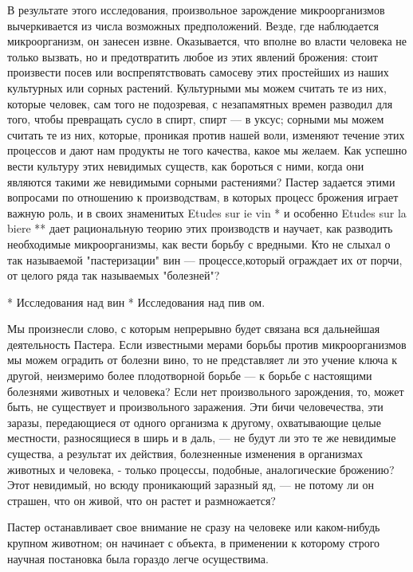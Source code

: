 В    результате    этого   исследования,    произвольное    зарождение
микроорганизмов вычеркивается из числа возможных предположений. Везде,
где  наблюдается микроорганизм,  он  занесен  извне. Оказывается,  что
вполне во власти человека не  только вызвать, но и предотвратить любое
из этих явлений брожения: стоит произвести посев или воспрепятствовать
самосеву  этих простейших  из  наших культурных  или сорных  растений.
Культурными мы можем  считать те из них, которые человек,  сам того не
подозревая, с незапамятных времен  разводил для того, чтобы превращать
сусло в спирт, спирт --- в уксус;  сорными мы можем считать те из них,
которые, проникая против нашей воли, изменяют течение этих процессов и
дают нам продукты не того качества, какое мы желаем. Как успешно вести
культуру  этих  невидимых существ,  как  бороться  с ними,  когда  они
являются  такими же  невидимыми  сорными  растениями? Пастер  задается
этими  вопросами  по  отношению  к производствам,  в  которых  процесс
брожения играет важную роль, и в  своих знаменитых Etudes sur ie vin *
и  особенно Etudes  sur  la  biere **  дает  рациональную теорию  этих
производств и  научает, как разводить необходимые  микроорганизмы, как
вести борьбу с вредными. Кто не слыхал о так называемой "пастеризации"
вин ---  процессе,который ограждает  их от порчи,  от целого  ряда так
называемых "болезней"?

* Исследования над вин * Исследования над пив                      ом.

Мы  произнесли   слово,  с   которым  непрерывно  будет   связана  вся
дальнейшая  деятельность   Пастера.  Если  известными   мерами  борьбы
против  микроорганизмов   мы  можем  оградить  от   болезни  вино,  то
не  представляет  ли  это  учение ключа  к  другой,  неизмеримо  более
плодотворной борьбе  --- к  борьбе с  настоящими болезнями  животных и
человека?  Если  нет  произвольного  зарождения, то,  может  быть,  не
существует  и  произвольного  заражения. Эти  бичи  человечества,  эти
заразы, передающиеся от одного организма к другому, охватывающие целые
местности, разносящиеся  в ширь и  в даль, --- не  будут ли это  те же
невидимые  существа, а  результат их  действия, болезненные  изменения
в  организмах  животных  и  человека,  -  только  процессы,  подобные,
аналогические брожению? Этот невидимый,  но всюду проникающий заразный
яд,  --- не  потому ли  он  страшен, что  он  живой, что  он растет  и
размножается?

Пастер  останавливает   свое  внимание   не  сразу  на   человеке  или
каком-нибудь крупном животном;  он начинает с объекта,  в применении к
которому строго научная постановка была гораздо легче осуществима.

